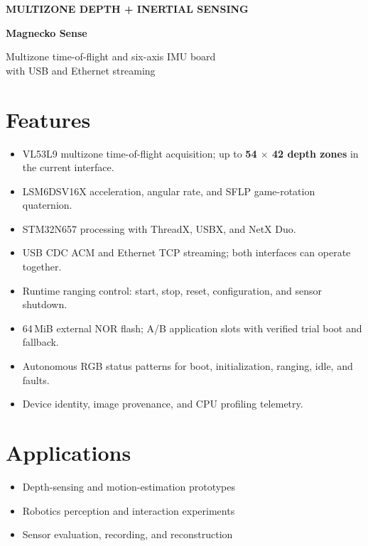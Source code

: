\documentclass[10pt,a4paper]{article}
\newcommand{\ProductName}{Magnecko Sense}
\begin{document}
{\color{MGSRed}\small\bfseries MULTIZONE DEPTH + INERTIAL SENSING}\par
\vspace{2mm}
{\fontsize{28}{31}\selectfont\bfseries\ProductName}\par
\vspace{1mm}
{\fontsize{14}{18}\selectfont Multizone time-of-flight and six-axis IMU board\\
with USB and Ethernet streaming}\par
\vspace{4mm}

\begin{minipage}[t]{0.475\linewidth}
\vspace{0pt}
\section{Features}\label{sec:features}
\begin{itemize}
  \item VL53L9 multizone time-of-flight acquisition; up to
    \textbf{54 $\times$ 42 depth zones} in the current interface.
  \item LSM6DSV16X acceleration, angular rate, and SFLP game-rotation quaternion.
  \item STM32N657 processing with ThreadX, USBX, and NetX Duo.
  \item USB CDC ACM and Ethernet TCP streaming; both interfaces can operate together.
  \item Runtime ranging control: start, stop, reset, configuration, and sensor shutdown.
  \item 64\,MiB external NOR flash; A/B application slots with verified trial boot and fallback.
  \item Autonomous RGB status patterns for boot, initialization, ranging, idle, and faults.
  \item Device identity, image provenance, and CPU profiling telemetry.
\end{itemize}
\section{Applications}\label{sec:applications}
\begin{itemize}
  \item Depth-sensing and motion-estimation prototypes
  \item Robotics perception and interaction experiments
  \item Sensor evaluation, recording, and reconstruction
\end{itemize}
\end{minipage}\hfill
\end{document}
